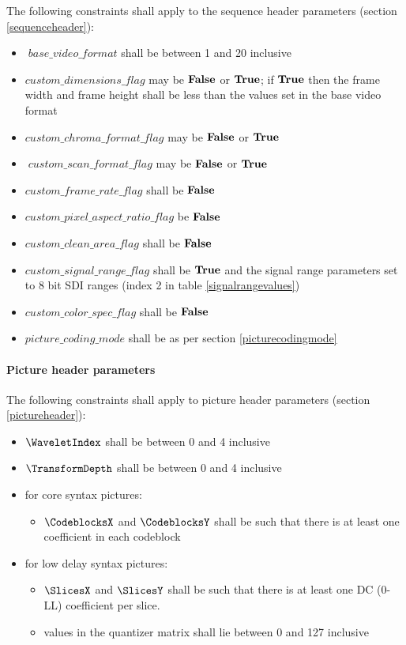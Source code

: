 The following constraints shall apply to the sequence header parameters
(section \ref{sequenceheader}):
\begin{itemize}
\item$base\_video\_format$ shall be between 1 and 20 inclusive
\item $custom\_dimensions\_flag$ may be $\text{\bf{False}}$ or $\text{\bf{True}}$; if $\text{\bf{True}}$ then
the frame width and frame height shall be less than the values set in the
base video format
\item $custom\_chroma\_format\_flag$ may be $\text{\bf{False}}$ or $\text{\bf{True}}$
\item$custom\_scan\_format\_flag$ may be $\text{\bf{False}}$ or $\text{\bf{True}}$
\item $custom\_frame\_rate\_flag$ shall be $\text{\bf{False}}$
\item $custom\_pixel\_aspect\_ratio\_flag$ be $\text{\bf{False}}$
\item $custom\_clean\_area\_flag$ shall be $\text{\bf{False}}$
\item $custom\_signal\_range\_flag$ shall be $\text{\bf{True}}$ and the signal range 
parameters set to 8 bit SDI ranges (index 2 in table \ref{signalrangevalues})
\item $custom\_color\_spec\_flag$ shall be $\text{\bf{False}}$
\item $picture\_coding\_mode$ shall be as per section \ref{picturecodingmode}
\end{itemize}

\paragraph{Picture header parameters\newline}

The following constraints shall apply to picture header parameters
(section \ref{pictureheader}):
\begin{itemize}
\item $\WaveletIndex$ shall be between 0 and 4 inclusive
\item $\TransformDepth$ shall be between 0 and 4 inclusive
\item for core syntax pictures:
    \begin{itemize}
    \item $\CodeblocksX$ and $\CodeblocksY$ shall be such that there is 
    at least one coefficient in each codeblock
    \end{itemize}
\item for low delay syntax pictures:
    \begin{itemize}
    \item $\SlicesX$ and $\SlicesY$ shall be such that there is at least one 
    DC (0-LL) coefficient per slice.
    \item values in the quantizer matrix shall lie between 0 and 127 inclusive
    \end{itemize}
\end{itemize}

